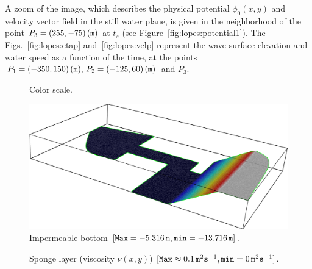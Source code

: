  A zoom of the image, which describes the physical potential
$\phi_0(x,y)$ and velocity vector field in the still water plane, is
given in the neighborhood of the point $P_3=(255,-75)\,({\tt m})$ at
$t_s$ (see Figure~\ref{fig:lopes:potential1}).  The
Figs.~\ref{fig:lopes:etap} and~\ref{fig:lopes:velp} represent the wave
surface elevation and water speed as a function of the time, at the
points $P_1=(-350, 150)\,({\tt m}),\, P_2=(-125,60)\,({\tt m})$ and
$P_3$.

\begin{figure}
  \begin{center}
  \end{center}
  \caption{Color scale.}
  \label{fig:lopes:scale}
\end{figure}

\begin{figure}
  \begin{center}
    \includegraphics[width=\largefig]{chapters/lopes/pdf/depth.pdf}
  \end{center}
  \caption{Impermeable bottom $[{\tt Max}=-5.316\,{\tt m},{\tt
      min}=-13.716\,{\tt m}]$.}
  \label{fig:lopes:harbor_depth}
\end{figure}

\begin{figure}
  \begin{center}
  \end{center}
  \caption{Sponge layer (viscosity $\nu(x,y)$) $[{\tt Max} \approx
    0.1\,{\tt m}^2{\tt s}^{-1}, {\tt min}=0 \,{\tt m}^2{\tt s}^{-1}]$.}
  \label{fig:lopes:sponge}
\end{figure}

